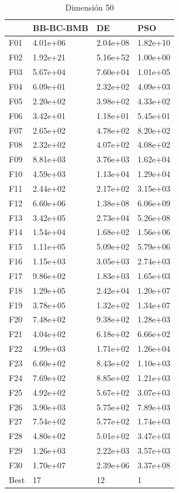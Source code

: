 \begin{table}[H]
    \begin{minipage}{.5\linewidth}
      \caption{Dimensión 50}
      \centering
      \begin{tabular}{llll}
        \toprule
        {} & BB-BC-BMB &        DE &       PSO \\
        \midrule
        F01  &  4.01e+06 &  2.04e+08 &  1.82e+10 \\
        F02  &  1.92e+21 &  5.16e+52 &  1.00e+00 \\
        F03  &  5.67e+04 &  7.60e+04 &  1.01e+05 \\
        F04  &  6.09e+01 &  2.32e+02 &  4.09e+03 \\
        F05  &  2.20e+02 &  3.98e+02 &  4.33e+02 \\
        F06  &  3.42e+01 &  1.18e+01 &  5.45e+01 \\
        F07  &  2.65e+02 &  4.78e+02 &  8.20e+02 \\
        F08  &  2.32e+02 &  4.07e+02 &  4.08e+02 \\
        F09  &  8.81e+03 &  3.76e+03 &  1.62e+04 \\
        F10  &  4.59e+03 &  1.13e+04 &  1.29e+04 \\
        F11  &  2.44e+02 &  2.17e+02 &  3.15e+03 \\
        F12  &  6.60e+06 &  1.38e+08 &  6.06e+09 \\
        F13  &  3.42e+05 &  2.73e+04 &  5.26e+08 \\
        F14  &  1.54e+04 &  1.68e+02 &  1.56e+06 \\
        F15  &  1.11e+05 &  5.09e+02 &  5.79e+06 \\
        F16  &  1.15e+03 &  3.05e+03 &  2.74e+03 \\
        F17  &  9.86e+02 &  1.83e+03 &  1.65e+03 \\
        F18  &  1.29e+05 &  2.42e+04 &  1.20e+07 \\
        F19  &  3.78e+05 &  1.32e+02 &  1.34e+07 \\
        F20  &  7.48e+02 &  9.38e+02 &  1.28e+03 \\
        F21  &  4.04e+02 &  6.18e+02 &  6.66e+02 \\
        F22  &  4.99e+03 &  1.71e+02 &  1.26e+04 \\
        F23  &  6.60e+02 &  8.43e+02 &  1.10e+03 \\
        F24  &  7.69e+02 &  8.85e+02 &  1.21e+03 \\
        F25  &  4.92e+02 &  5.67e+02 &  3.07e+03 \\
        F26  &  3.90e+03 &  5.75e+02 &  7.89e+03 \\
        F27  &  7.54e+02 &  5.77e+02 &  1.74e+03 \\
        F28  &  4.80e+02 &  5.01e+02 &  3.47e+03 \\
        F29  &  1.26e+03 &  2.22e+03 &  3.57e+03 \\
        F30  &  1.70e+07 &  2.39e+06 &  3.37e+08 \\
        Best &        17 &        12 &         1 \\
        \bottomrule
        \end{tabular}
        

\end{minipage}
\end{table}
